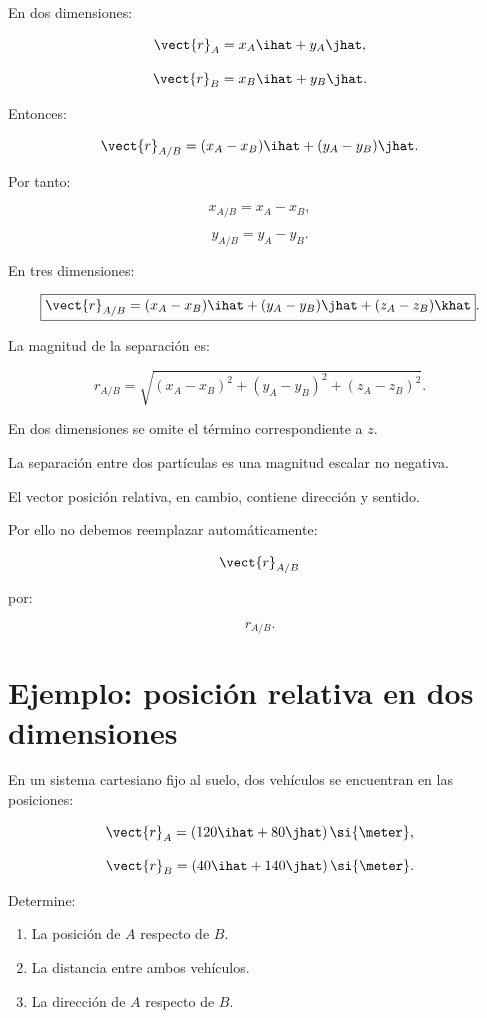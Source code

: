 En dos dimensiones:

\[
\vect{r}_A=x_A\ihat+y_A\jhat,
\]

\[
\vect{r}_B=x_B\ihat+y_B\jhat.
\]

Entonces:

\[
\vect{r}_{A/B}
=
(x_A-x_B)\ihat+(y_A-y_B)\jhat.
\]

Por tanto:

\[
\boxed{
x_{A/B}=x_A-x_B
},
\]

\[
\boxed{
y_{A/B}=y_A-y_B
}.
\]

En tres dimensiones:

\[
\boxed{
\vect{r}_{A/B}
=
(x_A-x_B)\ihat
+
(y_A-y_B)\jhat
+
(z_A-z_B)\khat
}.
\]

La magnitud de la separación es:

\[
\boxed{
r_{A/B}
=
\sqrt{
(x_A-x_B)^2+
(y_A-y_B)^2+
(z_A-z_B)^2
}
}.
\]

En dos dimensiones se omite el término correspondiente a \(z\).

\begin{advertencia}

La separación entre dos partículas es una magnitud escalar
no negativa.

El vector posición relativa, en cambio, contiene dirección
y sentido.

Por ello no debemos reemplazar automáticamente:

\[
\vect{r}_{A/B}
\]

por:

\[
r_{A/B}.
\]

\end{advertencia}


\section{Ejemplo: posición relativa en dos dimensiones}

\begin{ejemplo}

En un sistema cartesiano fijo al suelo, dos vehículos
se encuentran en las posiciones:

\[
\vect{r}_A
=
(120\ihat+80\jhat)\,\si{\meter},
\]

\[
\vect{r}_B
=
(40\ihat+140\jhat)\,\si{\meter}.
\]

Determine:

\begin{enumerate}[label=\alph*)]
    \item La posición de \(A\) respecto de \(B\).
    \item La distancia entre ambos vehículos.
    \item La dirección de \(A\) respecto de \(B\).
\end{enumerate}

\end{ejemplo}

